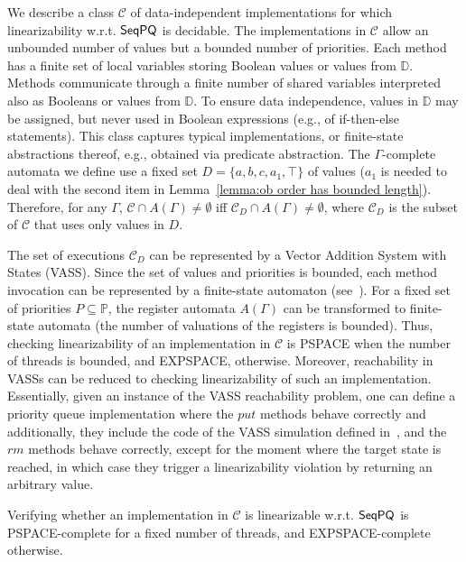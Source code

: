 \documentclass[a4paper,UKenglish]{lipics-v2016}
\begin{document}
We describe a class $\mathcal{C}$ of data-independent implementations for which linearizability w.r.t. $\mathsf{SeqPQ}$ is decidable. The implementations in $\mathcal{C}$ allow an unbounded number of values but a bounded number of priorities. Each method has a finite set of local variables storing Boolean values or values from $\mathbb{D}$. Methods communicate through a finite number of shared variables interpreted also as Booleans or values from $\mathbb{D}$. To ensure data independence, values in $\mathbb{D}$ may be assigned, but never used in Boolean expressions (e.g., of if-then-else statements). This class captures typical implementations, or finite-state abstractions thereof, e.g., obtained via predicate abstraction. The $\Gamma$-complete automata we define use a fixed set $D=\{a,b,c,a_1,\top\}$ of values ($a_1$ is needed to deal with the second item in Lemma~\ref{lemma:ob order has bounded length}). Therefore, for any $\Gamma$, $\mathcal{C}\cap A(\Gamma)\neq\emptyset$ iff $\mathcal{C}_D\cap A(\Gamma)\neq\emptyset$, where $\mathcal{C}_D$ is the subset of $\mathcal{C}$ that uses only values in $D$. 

The set of executions $\mathcal{C}_D$ can be represented by a Vector Addition System with States (VASS). Since the set of values and priorities is bounded, each method invocation can be represented by a finite-state automaton (see~\cite{conf/esop/BouajjaniEEH13}). For a fixed set of priorities $P\subseteq \mathbb{P}$, the register automata $A(\Gamma)$ can be transformed to finite-state automata (the number of valuations of the registers is bounded). Thus, checking linearizability of an implementation in $\mathcal{C}$ is PSPACE when the number of threads is bounded, and EXPSPACE, otherwise. Moreover, reachability in VASSs can be reduced to checking linearizability of such an implementation. Essentially, given an instance of the VASS reachability problem, one can define a priority queue implementation where the $\textit{put}$ methods behave correctly and additionally, they include the code of the VASS simulation defined in~\cite{conf/esop/BouajjaniEEH13}, and the $\textit{rm}$ methods behave correctly, except for the moment where the target state is reached, in which case they trigger a linearizability violation by returning an arbitrary value.





\begin{theorem}
\label{theorem:complexity of priority queue}
Verifying whether an implementation in $\mathcal{C}$ is linearizable w.r.t. $\mathsf{SeqPQ}$ is PSPACE-complete for a fixed number of threads, and EXPSPACE-complete otherwise.
\end{theorem}
\end{document}
